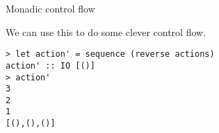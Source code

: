 %
\begin{frame}[fragile]{Monadic control flow}

We can use this to do some clever control flow.

\begin{block}{}
\begin{verbatim}
> let action' = sequence (reverse actions)
action' :: IO [()]
> action'
3
2
1
[(),(),()]
\end{verbatim}
\end{block}

\end{frame}
